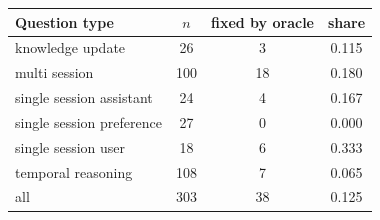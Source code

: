 \begin{tabular}{lccc}
\toprule
Question type & $n$ & fixed by oracle & share \\
\midrule
knowledge update & 26 & 3 & 0.115 \\
multi session & 100 & 18 & 0.180 \\
single session assistant & 24 & 4 & 0.167 \\
single session preference & 27 & 0 & 0.000 \\
single session user & 18 & 6 & 0.333 \\
temporal reasoning & 108 & 7 & 0.065 \\
\midrule
all & 303 & 38 & 0.125 \\
\bottomrule
\end{tabular}